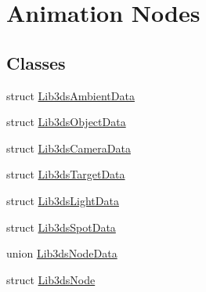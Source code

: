 \hypertarget{group__node}{\section{Animation Nodes}
\label{group__node}
}
\subsection*{Classes}
\begin{DoxyCompactItemize}
\item 
struct \hyperlink{struct_lib3ds_ambient_data}{Lib3ds\-Ambient\-Data}
\item 
struct \hyperlink{struct_lib3ds_object_data}{Lib3ds\-Object\-Data}
\item 
struct \hyperlink{struct_lib3ds_camera_data}{Lib3ds\-Camera\-Data}
\item 
struct \hyperlink{struct_lib3ds_target_data}{Lib3ds\-Target\-Data}
\item 
struct \hyperlink{struct_lib3ds_light_data}{Lib3ds\-Light\-Data}
\item 
struct \hyperlink{struct_lib3ds_spot_data}{Lib3ds\-Spot\-Data}
\item 
union \hyperlink{union_lib3ds_node_data}{Lib3ds\-Node\-Data}
\item 
struct \hyperlink{struct_lib3ds_node}{Lib3ds\-Node}
\end{DoxyCompactItemize}
